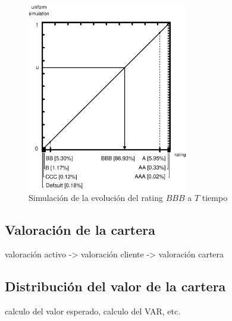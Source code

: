 \begin{figure}[!hb]
\begin{center}
\includegraphics[width=7cm,angle=0]{./images/simrp.eps}
\caption{Simulaci\'on de la evoluci\'on del rating $BBB$ a $T$ tiempo}
\label{simrp}
\end{center}
\end{figure}


\subsection{Valoraci\'on de la cartera}
valoraci\'on activo -> valoraci\'on cliente -> valoraci\'on cartera

\subsection{Distribuci\'on del valor de la cartera}
calculo del valor esperado, calculo del VAR, etc.

